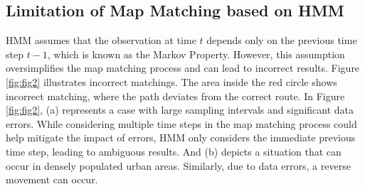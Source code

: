 \documentclass[preprint,12pt]{elsarticle}
\begin{document}
\subsection{Limitation of Map Matching based on HMM}
\label{sec:sec3:sec3}
HMM assumes that the observation at time $t$ depends only on the previous time step $t-1$, which is known as the Markov Property. However, this assumption oversimplifies the map matching process and can lead to incorrect results. Figure \ref{fig:fig2} illustrates incorrect matchings. The area inside the red circle shows incorrect matching, where the path deviates from the correct route.
In Figure \ref{fig:fig2}, (a) represents a case with large sampling intervals and significant data errors. While considering multiple time steps in the map matching process could help mitigate the impact of errors, HMM only considers the immediate previous time step, leading to ambiguous results.
And (b) depicts a situation that can occur in densely populated urban areas. Similarly, due to data errors, a reverse movement can occur.
\end{document}
